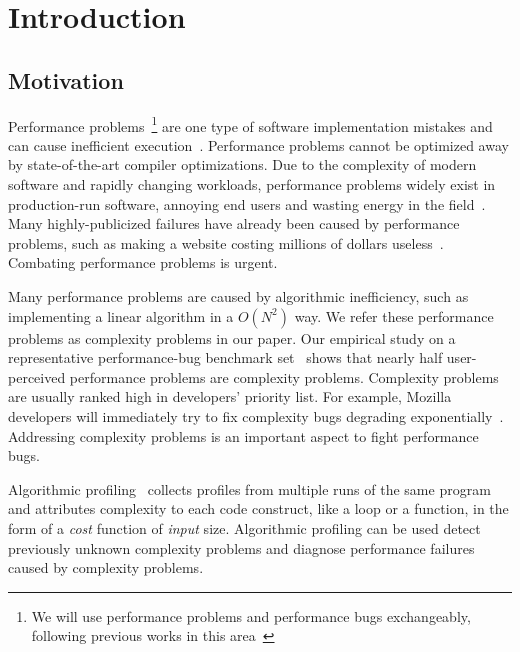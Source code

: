 \section{Introduction}
\label{sec:intro}

\subsection{Motivation}
\label{sec:motiv}

Performance problems~\footnote{We will use performance problems and performance bugs exchangeably, 
following previous works in this area~\cite{SongOOPSLA2014,ldoctor}} 
are one type of software implementation mistakes
and can cause inefficient execution~\cite{PerfBug,perf.fse10,SongOOPSLA2014,ldoctor,Alabama}. 
Performance problems cannot be optimized away by state-of-the-art compiler optimizations.
Due to the complexity of modern software and rapidly changing workloads, 
performance problems widely exist in production-run software, 
annoying end users and wasting energy in the field~\cite{PerfBug,SongOOPSLA2014,ldoctor}. 
Many highly-publicized failures have already been caused by performance problems, 
such as making a website costing millions of dollars useless~\cite{ACA-health}.
Combating performance problems is urgent. 

Many performance problems are caused by algorithmic inefficiency, 
such as implementing a linear algorithm in a $O(N^2)$ way.
We refer these performance problems as complexity problems in our paper.
Our empirical study on a representative performance-bug 
benchmark set~\cite{PerfBug,SongOOPSLA2014} shows that 
nearly half user-perceived performance problems are complexity problems. 
Complexity problems are usually ranked high in developers' priority list. 
For example, Mozilla developers will immediately try to fix complexity bugs degrading exponentially~\cite{mozilla35294}. 
Addressing complexity problems is an important aspect to fight performance bugs. 


Algorithmic profiling~\cite{Aprof1,Aprof2,AlgoProf} collects profiles from multiple 
runs of the same program and attributes complexity to each code construct, like a loop or a function,
in the form of a \textit{cost} function of \textit{input} size. 
Algorithmic profiling can be used detect previously unknown complexity problems and 
diagnose performance failures caused by complexity problems. 

